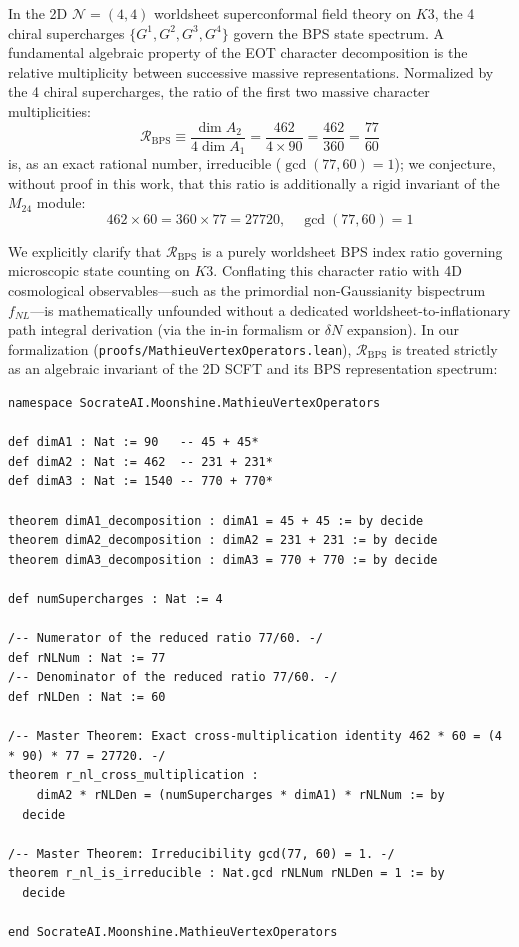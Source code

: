 \documentclass[11pt,a4paper]{article}
\begin{document}
In the 2D $\mathcal{N}=(4,4)$ worldsheet superconformal field theory on $K3$, the 4 chiral supercharges $\{G^1, G^2, G^3, G^4\}$ govern the BPS state spectrum. A fundamental algebraic property of the EOT character decomposition is the relative multiplicity between successive massive representations. Normalized by the 4 chiral supercharges, the ratio of the first two massive character multiplicities:
\begin{equation}
\mathcal{R}_{\text{BPS}} \equiv \frac{\dim A_2}{4 \dim A_1} = \frac{462}{4 \times 90} = \frac{462}{360} = \frac{77}{60}
\end{equation}
is, as an exact rational number, irreducible ($\gcd(77,60)=1$); we conjecture, without proof in this work, that this ratio is additionally a rigid invariant of the $M_{24}$ module:
\begin{equation}
462 \times 60 = 360 \times 77 = 27720, \quad \gcd(77, 60) = 1
\end{equation}

We explicitly clarify that $\mathcal{R}_{\text{BPS}}$ is a purely worldsheet BPS index ratio governing microscopic state counting on $K3$. Conflating this character ratio with 4D cosmological observables—such as the primordial non-Gaussianity bispectrum $f_{NL}$—is mathematically unfounded without a dedicated worldsheet-to-inflationary path integral derivation (via the in-in formalism or $\delta N$ expansion). In our formalization (\texttt{proofs/MathieuVertexOperators.lean}), $\mathcal{R}_{\text{BPS}}$ is treated strictly as an algebraic invariant of the 2D SCFT and its BPS representation spectrum:

\begin{lstlisting}[language=lean, caption={Lean 4 Arithmetic Verification of the BPS Character Ratio ($M_{24}$ character decompositions verified in \texttt{DualScaleStream2.Moonshine})}]
namespace SocrateAI.Moonshine.MathieuVertexOperators

def dimA1 : Nat := 90   -- 45 + 45*
def dimA2 : Nat := 462  -- 231 + 231*
def dimA3 : Nat := 1540 -- 770 + 770*

theorem dimA1_decomposition : dimA1 = 45 + 45 := by decide
theorem dimA2_decomposition : dimA2 = 231 + 231 := by decide
theorem dimA3_decomposition : dimA3 = 770 + 770 := by decide

def numSupercharges : Nat := 4

/-- Numerator of the reduced ratio 77/60. -/
def rNLNum : Nat := 77
/-- Denominator of the reduced ratio 77/60. -/
def rNLDen : Nat := 60

/-- Master Theorem: Exact cross-multiplication identity 462 * 60 = (4 * 90) * 77 = 27720. -/
theorem r_nl_cross_multiplication :
    dimA2 * rNLDen = (numSupercharges * dimA1) * rNLNum := by
  decide

/-- Master Theorem: Irreducibility gcd(77, 60) = 1. -/
theorem r_nl_is_irreducible : Nat.gcd rNLNum rNLDen = 1 := by
  decide

end SocrateAI.Moonshine.MathieuVertexOperators
\end{lstlisting}
\end{document}
